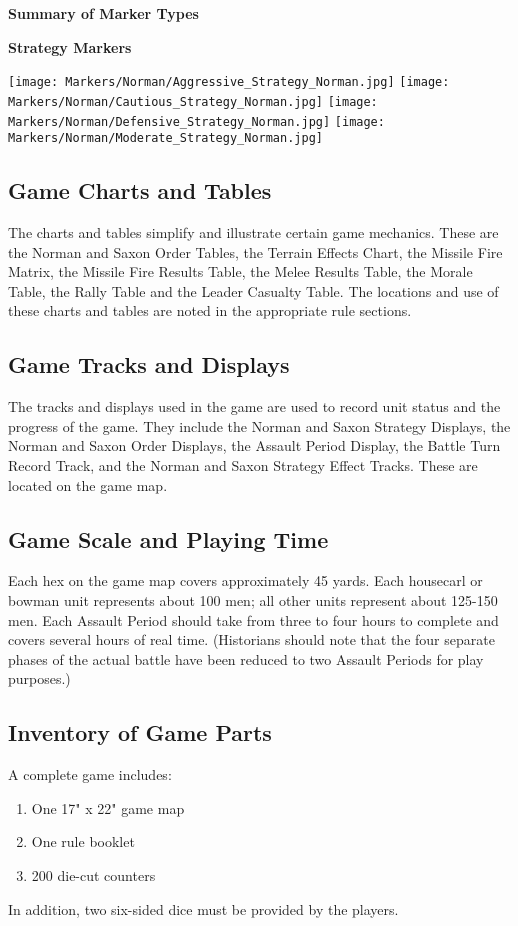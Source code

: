 \par
\begin{center}
  \textbf{Summary of Marker Types}
  \break
  \par
  \textbf{Strategy Markers}
\end{center}

\hspace{1em}
\texttt{[image: Markers/Norman/Aggressive\_Strategy\_Norman.jpg]}
\hspace{1em}
\texttt{[image: Markers/Norman/Cautious\_Strategy\_Norman.jpg]}
\hspace{1em}
\texttt{[image: Markers/Norman/Defensive\_Strategy\_Norman.jpg]}
\hspace{1em}
\texttt{[image: Markers/Norman/Moderate\_Strategy\_Norman.jpg]}

\subsection{Game Charts and Tables}


The charts and tables simplify and illustrate certain game mechanics. These are the Norman and Saxon Order Tables, the Terrain Effects Chart, the Missile Fire Matrix, the Missile Fire Results Table, the Melee Results Table, the Morale Table, the Rally Table and the Leader Casualty Table. The locations and use of these charts and tables are noted in the appropriate rule sections.

\subsection{Game Tracks and Displays}

The tracks and displays used in the game are used to record unit status and the progress of the game. They include the Norman and Saxon Strategy Displays, the Norman and Saxon Order Displays, the Assault Period Display, the Battle Turn Record Track, and the Norman and Saxon Strategy Effect Tracks. These are located on the game map.

\subsection{Game Scale and Playing Time}

Each hex on the game map covers approximately 45 yards. Each housecarl or bowman unit represents about 100 men; all other units represent about 125-150 men. Each Assault Period should take from three to four hours to complete and covers several hours of real time. (Historians should note that the four separate phases of the actual battle have been reduced to two Assault Periods for play purposes.)

\subsection{Inventory of Game Parts}

A complete game includes:

\begin{enumerate}[label=*]
    \item One 17" x 22" game map
    \item One rule booklet
    \item 200 die-cut counters
\end{enumerate}

In addition, two six-sided dice must be provided by the players.